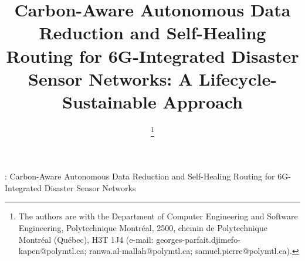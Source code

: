 \documentclass[12pt, onecolumn, journal]{IEEEtran}
\begin{document}
%
\title{Carbon-Aware Autonomous Data Reduction and Self-Healing Routing for 6G-Integrated Disaster Sensor Networks: A Lifecycle-Sustainable Approach}

\author{
\thanks{The authors are with the Department of Computer Engineering and Software Engineering, Polytechnique Montréal, 2500, chemin de Polytechnique
Montréal (Québec), H3T 1J4 (e-mail: georges-parfait.djimefo-kapen@polymtl.ca; ranwa.al-mallah@polymtl.ca; samuel.pierre@polymtl.ca).}}





%
{: Carbon-Aware Autonomous Data Reduction and Self-Healing Routing for 6G-Integrated Disaster Sensor Networks}
% 
\end{document}
